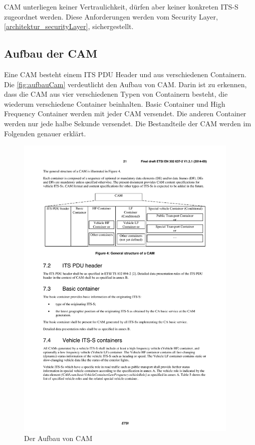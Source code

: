 \ac{CAM} unterliegen keiner Vertraulichkeit, dürfen aber keiner konkreten \ac{ITS-S} zugeordnet werden. Diese Anforderungen werden vom Security Layer, \autoref{architektur_securityLayer}, sichergestellt. 

 
\subsection{Aufbau der CAM}
Eine \ac{CAM} besteht einem \ac{ITS} \ac{PDU} Header und aus verschiedenen Containern. Die \autoref{fig:aufbauCam} verdeutlicht den Aufbau von \ac{CAM}. Darin ist zu erkennen, dass die \ac{CAM} aus vier verschiedenen Typen von Containern besteht, die wiederum verschiedene Container beinhalten. Basic Container und High Frequency Container werden mit jeder \ac{CAM} versendet. Die anderen Container werden nur jede halbe Sekunde versendet. Die Bestandteile der \ac{CAM} werden im Folgenden genauer erklärt.

\begin{figure}[htbp]
	\includegraphics[width=0.95\textwidth]{content/images/04_facilitylayer/camAufbau.pdf}
	\caption{Der Aufbau von CAM \cite{en302637-2}}
	\label{fig:aufbauCam}
\end{figure}

